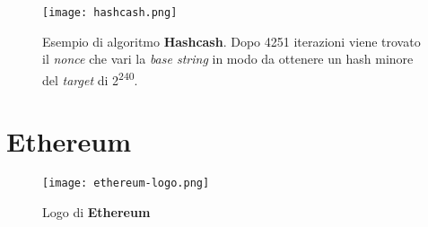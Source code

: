     \begin{figure}[h!]
        \centering
        \texttt{[image: hashcash.png]}
        \caption[Esempio di algoritmo Hashcash]{Esempio di algoritmo \textbf{Hashcash}. Dopo 4251 iterazioni viene trovato il \textit{nonce} che vari la \textit{base string} in modo da ottenere un hash minore del \textit{target} di 2\textsuperscript{240}.}
        \label{img:hashcash}
    \end{figure}

\newpage

\section{Ethereum}

\begin{figure}[h!]
    \centering
    \texttt{[image: ethereum-logo.png]}
    \caption{Logo di \textbf{Ethereum}}
\end{figure}

